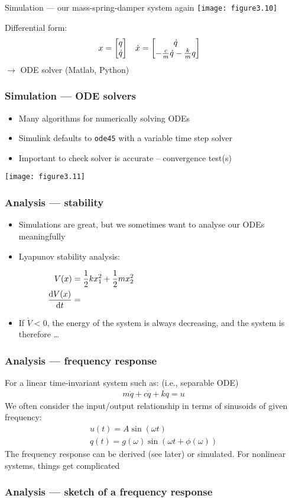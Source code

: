 \documentclass{beamer-control}
\begin{document}
\begin{frame}{Simulation --- our mass-spring-damper system again}
\texttt{[image: figure3.10]}

Differential form:
\begin{align}
x &= \begin{bmatrix}q\\\dot q\end{bmatrix} & \dot x & = \begin{bmatrix}\dot q\\- \frac cm\dot q - \frac km q\end{bmatrix}
\end{align}
$\to$ ODE solver (Matlab, Python)
\end{frame}

\begin{frame}
\frametitle{Simulation --- ODE solvers}
\begin{itemize}
\item Many algorithms for numerically solving ODEs
\item Simulink defaults to \texttt{ode45} with a variable time step solver
\item Important to check solver is accurate -- convergence test(s)
\end{itemize}
\texttt{[image: figure3.11]}
\end{frame}

\begin{frame}
\frametitle{Analysis --- stability}
\begin{itemize}
\item
Simulations are great, but we sometimes want to analyse our ODEs meaningfully
\item
Lyapunov stability analysis:
\end{itemize}
\begin{align}
V(x) &= \frac12kx_1^2 + \frac12mx_2^2 & \hspace{5cm}\\
\Deriv{V(x)}{t} &= 
\end{align}
\vfill
\vspace*{1cm}
\begin{itemize}
\item If $\dot V < 0$, the energy of the system is always decreasing, and the system is therefore \dots
\end{itemize}
\vspace*{-1cm}
\end{frame}

\begin{frame}
\frametitle{Analysis --- frequency response}
For a linear time-invariant system such as: (i.e., separable ODE)
\begin{gather}
m\ddot q + c\dot q + k q = u
\end{gather}
We often consider the input/output relationship in terms of sinusoids of given frequency:
\begin{gather}
u(t) = A\sin(\omega t) \\
q(t) = g(\omega)\sin(\omega t + \phi(\omega))
\end{gather}
The frequency response can be derived (see later) or simulated. For nonlinear systems, things get complicated
\end{frame}

\begin{frame}
\frametitle{Analysis --- sketch of a frequency response}
\end{frame}


\SUMMARYFRAME
\FINALE
\end{document}
